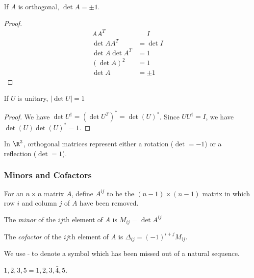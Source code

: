\documentclass[a4paper]{article}
\begin{document}
\begin{cor}
  If $A$ is orthogonal, $\det A = \pm 1$.
\end{cor}

\begin{proof}
  \begin{align*}
    AA^T &= I\\
    \det AA^T &= \det I\\
    \det A\det A^T &= 1\\
    (\det A)^2 &= 1\\
    \det A &= \pm 1
  \end{align*}
\end{proof}

\begin{cor}
  If $U$ is unitary, $|\det U| = 1$
\end{cor}

\begin{proof}
  We have $\det U^\dagger = (\det U^T)^* = \det(U)^*$. Since $UU^\dagger = I$, we have $\det(U)\det(U)^* = 1$.
\end{proof}

\begin{prop}
  In $\R^3$, orthogonal matrices represent either a rotation ($\det = -1$) or a reflection ($\det = 1$).
\end{prop}
\subsubsection{Minors and Cofactors}
\begin{defi}
  For an $n\times n$ matrix $A$, define $A^{ij}$ to be the $(n - 1)\times (n - 1)$ matrix in which row $i$ and column $j$ of $A$ have been removed.

  The \emph{minor} of the $ij$th element of $A$ is $M_{ij} = \det A^{ij}$

  The \emph{cofactor} of the $ij$th element of $A$ is $\Delta_{ij} = (-1)^{i + j}M_{ij}$.
\end{defi}

\begin{notation}
  We use $\bar \;$ to denote a symbol which has been missed out of a natural sequence.
\end{notation}
\begin{eg}
  $1, 2, 3, 5 = 1, 2, 3, \bar 4, 5$.
\end{eg}
\end{document}
